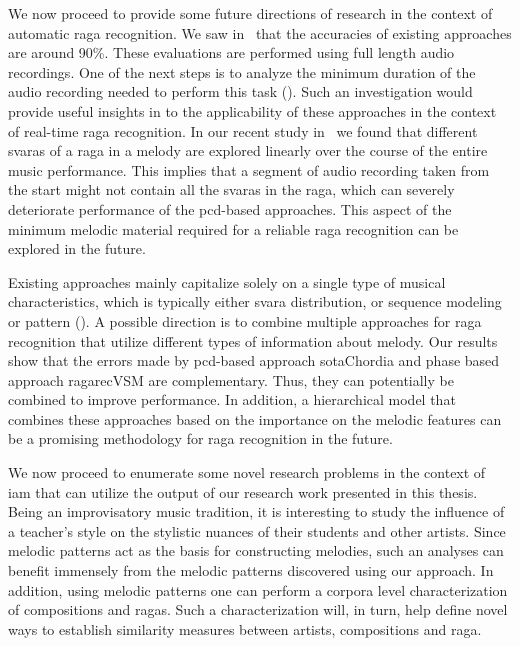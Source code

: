 We now proceed to provide some future directions of research in the context of automatic \gls{raga} recognition. We saw in~ that the accuracies of existing approaches are around 90\%. These evaluations are performed using full length audio recordings. One of the next steps is to analyze the minimum duration of the audio recording needed to perform this task (\cite{balkwill1999cross}). Such an investigation would provide useful insights in to the applicability of these approaches in the context of real-time \gls{raga} recognition. In our recent study in~\cite{kaustuv_ismir_2016} we found that different \glspl{svara} of a \gls{raga} in a melody are explored linearly over the course of the entire music performance. This implies that a segment of audio recording taken from the start might not contain all the \glspl{svara} in the \gls{raga}, which can severely deteriorate performance of the \gls{pcd}-based approaches. This aspect of the minimum melodic material required for a reliable \gls{raga} recognition can be explored in the future. 

Existing approaches mainly capitalize solely on a single type of musical characteristics, which is typically either svara distribution, or sequence modeling or pattern (). A possible direction is to combine multiple approaches for \gls{raga} recognition that utilize different types of information about melody. Our results show that the errors made by \gls{pcd}-based approach \acrshort{sotaChordia} and phase based approach \acrshort{ragarecVSM} are complementary. Thus, they can potentially be combined to improve performance. In addition, a hierarchical model that combines these approaches based on the importance on the melodic features can be a promising methodology for \gls{raga} recognition in the future.

We now proceed to enumerate some novel research problems in the context of \gls{iam} that can utilize the output of our research work presented in this thesis. Being an improvisatory music tradition, it is interesting to study the influence of a teacher’s style on the stylistic nuances of their students and other artists. Since melodic patterns act as the basis for constructing melodies, such an analyses can benefit immensely from the melodic patterns discovered using our approach. In addition, using melodic patterns one can perform a corpora level characterization of compositions and \glspl{raga}. Such a characterization will, in turn, help define novel ways to establish similarity measures between artists, compositions and \gls{raga}.

